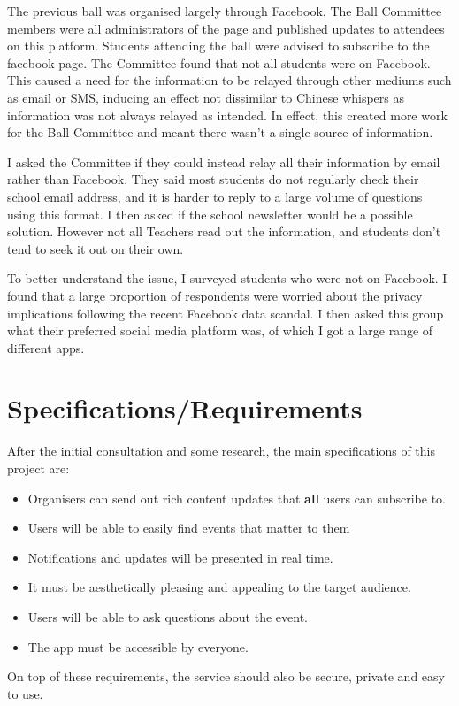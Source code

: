 \documentclass[a4paper,oneside,12pt,draft]{report}
\begin{document}
    The previous ball was organised largely through Facebook. The Ball Committee members were all administrators of the page and published updates to attendees on this platform. Students attending the ball were advised to subscribe to the facebook page. The Committee found that not all students were on Facebook. This caused a need for the information to be relayed through other mediums such as email or SMS, inducing an effect not dissimilar to Chinese whispers as information was not always relayed as intended. In effect, this created more work for the Ball Committee and meant there wasn't a single source of information.

    I asked the Committee if they could instead relay all their information by email rather than Facebook. They said most students do not regularly check their school email address, and it is harder to reply to a large volume of questions using this format. I then asked if the school newsletter would be a possible solution. However not all Teachers read out the information, and students don't tend to seek it out on their own.

    To better understand the issue, I surveyed students who were not on Facebook. I found that a large proportion of respondents were worried about the privacy implications following the recent Facebook data scandal. I then asked this group what their preferred social media platform was, of which I got a large range of different apps.

	\section{Specifications/Requirements}
	After the initial consultation and some research, the main specifications of this project are:
	\begin{itemize}
		\item Organisers can send out rich content updates that \textbf{all} users can subscribe to.
		\item Users will be able to easily find events that matter to them
		\item Notifications and updates will be presented in real time.
		\item It must be aesthetically pleasing and appealing to the target audience.
		\item Users will be able to ask questions about the event.
		\item The app must be accessible by everyone.
	\end{itemize}
	On top of these requirements, the service should also be secure, private and easy to use.
\end{document}
